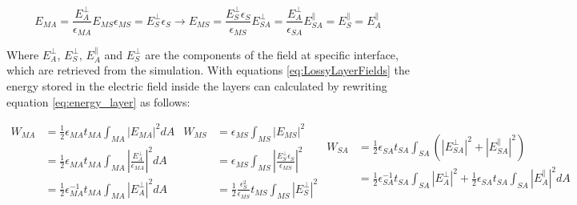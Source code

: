 \begin{subequations}\label{eq:LossyLayerFields}
	\begin{equation} \label{eq:LossyLayerFieldsA}
	E_{MA} =\frac{ E_{A}^{\bot}}{\epsilon_{MA}}
	\end{equation}	
	\begin{equation} \label{eq:LossyLayerFieldsB}
	E_{MS}\epsilon_{MS}=E_{S}^{\bot}\epsilon_{S} \rightarrow E_{MS}= \frac{E_{S}^{\bot}\epsilon_{S}}{\epsilon_{MS}}
	\end{equation}
	\begin{equation}\label{eq:LossyLayerFieldsC}
	E_{SA}^{\bot}=\frac{E_{A}^{\bot}}{\epsilon_{SA}}
	\end{equation}
	\begin{equation}\label{eq:LossyLayerFieldsD}
	E_{SA}^{\parallel}=E_{S}^{\parallel}=E_{A}^{\parallel}
	\end{equation}
\end{subequations}

Where \(E_{A}^{\bot}\), \(E_{S}^{\bot}\), \(E_{A}^{\parallel}\) and \(E_{S}^{\bot}\) are the components of the field at specific interface, which are retrieved from the simulation. With equations \eqref{eq:LossyLayerFields} the energy stored in the electric field inside the layers can calculated by rewriting equation \eqref{eq:energy_layer} as follows:

\begin{subequations}\label{eq:LossyLayerEnergy}
	\begin{equation} \label{eq:LossyLayerEnergyA}
		\begin{align*}
			W_{MA} &=\frac{1}{2}\epsilon_{MA}t_{MA}\int_{MA}^{}|E_{MA}|^{2}dA \\
				   &=\frac{1}{2}\epsilon_{MA}t_{MA}\int_{MA}^{}|\frac{E_{A}^{\bot}}{\epsilon_{MA}}|^{2}dA \\
				   &=\frac{1}{2}\epsilon_{MA}^{-1}t_{MA}\int_{MA}^{}|E_{A}^{\bot}|^{2}dA
		\end{align*}
	\end{equation}	
	\begin{equation} \label{eq:LossyLayerEnergyB}
		\begin{align*}
			W_{MS} &=\epsilon_{MS}\int_{MS}^{}|E_{MS}|^{2} \\
			&=\epsilon_{MS}\int_{MS}^{}|\frac{E_{S}^{\bot}\epsilon_{S}}{\epsilon_{MS}}|^{2}\\ 
			&=\frac{1}{2}\frac{\epsilon_{S}^{2}}{\epsilon_{MS}}t_{MS}\int_{MS}^{}|E_{S}^{\bot}|^{2} 
		\end{align*}
	\end{equation}
	\begin{equation}\label{eq:LossyLayerEnergyC}
		\begin{align*}
			W_{SA} &=\frac{1}{2}\epsilon_{SA}^{}t_{SA}\int_{SA}^{}(|E_{SA}^{\bot}|^{2} + |E_{SA}^{\parallel}|^{2})\\
			&=\frac{1}{2}\epsilon_{SA}^{-1}t_{SA}\int_{SA}^{}|E_{A}^{\bot}|^{2} +\frac{1}{2} \epsilon_{SA}t_{SA}\int_{SA}^{}|E_{A}^{\parallel}|^{2}dA
		\end{align*}
	\end{equation}
\end{subequations}

